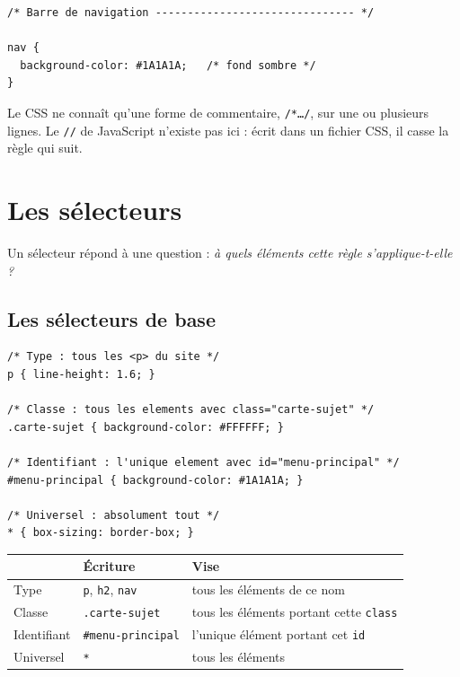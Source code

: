 \documentclass[a4paper,11pt]{article}
\newcommand{\hdr}[1]{\multicolumn{1}{l}{\color{white}\bfseries #1}}
\renewcommand{\arraystretch}{1.3}
\begin{document}
\begin{lstlisting}[language=CSS3, caption={Le seul commentaire du CSS}]
/* Barre de navigation ------------------------------- */

nav {
  background-color: #1A1A1A;   /* fond sombre */
}
\end{lstlisting}

Le CSS ne connaît qu'une forme de commentaire, \texttt{/*\ldots*/}, sur une ou plusieurs lignes. Le \texttt{//} de JavaScript n'existe pas ici : écrit dans un fichier CSS, il casse la règle qui suit.

\section{Les sélecteurs}

Un sélecteur répond à une question : \textit{à quels éléments cette règle s'applique-t-elle ?}

\subsection{Les sélecteurs de base}

\begin{lstlisting}[language=CSS3, caption={Type, classe, identifiant, universel}]
/* Type : tous les <p> du site */
p { line-height: 1.6; }

/* Classe : tous les elements avec class="carte-sujet" */
.carte-sujet { background-color: #FFFFFF; }

/* Identifiant : l'unique element avec id="menu-principal" */
#menu-principal { background-color: #1A1A1A; }

/* Universel : absolument tout */
* { box-sizing: border-box; }
\end{lstlisting}

\begin{center}
\renewcommand{\arraystretch}{1.0}
\begin{tabularx}{\linewidth}{p{2.4cm}p{3cm}X}
  \toprule
  \rowcolor{uniNavy}
  \hdr{Sélecteur} & \hdr{Écriture} & \hdr{Vise} \\
  \midrule
  \rowcolor{uniPaper}
  Type & \texttt{p}, \texttt{h2}, \texttt{nav} & tous les éléments de ce nom \\
  Classe & \texttt{.carte-sujet} & tous les éléments portant cette \texttt{class} \\
  \rowcolor{uniPaper}
  Identifiant & \texttt{\#menu-principal} & l'unique élément portant cet \texttt{id} \\
  Universel & \texttt{*} & tous les éléments \\
  \bottomrule
\end{tabularx}
\end{center}
\end{document}
